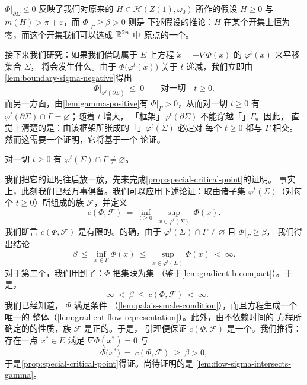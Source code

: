 \trEstimate{} $\Phi\big|_{\partial\Sigma}\leq0$ 反映了我们对原来的%
\trHamiltonianFunction{} $H\in\mathcal{H}(Z(1),\omega_{0})$ 所作的假设%
$H\geq0$ 与 $m(H)>\pi+\varepsilon$，而 $\Phi\big|_{\Gamma}\geq\beta>0$ 则是%
下述假设的推论：$H$ 在某个开集上恒为零，而这个开集我们可以选成 $\mathbb{R}^{2n}$ 中%
原点的一个\trNeighborhood。

接下来我们研究：如果我们借助属于 $E$ 上\trGradient{}方程%
$\dot{x}=-\nabla\Phi(x)$ 的\trFlow{} $\varphi^{t}(x)$ 来平移集合 $\Sigma$，%
将会发生什么。由于 $\Phi\bigl(\varphi^{t}(x)\bigr)$ 关于 $t$ 递减，我们立即由%
\cref{lem:boundary-sigma-negative}得出
\begin{equation}\label{eq:phi-boundary-translate}
\Phi\big|_{\varphi^{t}(\partial\Sigma)}\ \leq\ 0\qquad\text{对一切}\quad t\geq0.
\end{equation}
而另一方面，由\cref{lem:gamma-positive}有 $\Phi\big|_{\Gamma}>0$，从而对一切%
$t\geq0$ 有 $\varphi^{t}(\partial\Sigma)\cap\Gamma=\varnothing$；随着 $t$ 增大，%
「框架」$\varphi^{t}(\partial\Sigma)$ 不能穿越「\trCircle」$\Gamma$。因此，%
直觉上清楚的是：由该框架所张成的「\trSurface」$\varphi^{t}(\Sigma)$ 必定对%
每个 $t\geq0$ 都与 $\Gamma$ 相交。然而这需要一个证明，它将基于一个%
\trTopology{}论证。

\begin{lemma}\label{lem:flow-sigma-intersects-gamma}
对一切 $t\geq0$ 有 $\varphi^{t}(\Sigma)\cap\Gamma\neq\varnothing$。
\end{lemma}

我们把它的证明往后放一放，先来完成\cref{prop:special-critical-point}的证明。%
事实上，此刻我们已经万事俱备。我们可以应用下述\trMinimax{}论证：取由诸子集%
$\varphi^{t}(\Sigma)$（对每个 $t\geq0$）所组成的族 $\mathcal{F}$，并定义
\[
c(\Phi,\mathcal{F})\ =\ \inf_{t\geq0}\ \sup_{x\in\varphi^{t}(\Sigma)}\ \Phi(x).
\]
我们断言 $c(\Phi,\mathcal{F})$ 是有限的。的确，由于%
$\varphi^{t}(\Sigma)\cap\Gamma\neq\varnothing$ 且 $\Phi\big|_{\Gamma}\geq\beta$，%
我们得出结论
\[
\beta\ \leq\ \inf_{x\in\Gamma}\Phi(x)\ \leq\ \sup_{x\in\varphi^{t}(\Sigma)}%
\Phi(x)\ <\ \infty.
\]
对于第二个\trEstimate，我们用到了：$\Phi$ 把\trBounded{}集映为\trBounded{}集%
（鉴于\cref{lem:gradient-b-compact}）。于是，
\[
-\infty\ <\ \beta\ \leq\ c(\Phi,\mathcal{F})\ <\ \infty.
\]
我们已经知道，\trFunctional{} $\Phi$ 满足\trPalaisSmale{}条件%
（\cref{lem:palais-smale-condition}），而且\trGradient{}方程生成一个唯一的%
整体\trFlow{}（\cref{lem:gradient-flow-representation}）。此外，由不依赖时间的%
方程所确定的\trFlow{}的性质，族 $\mathcal{F}$ 是正\trInvariant{}的。于是，%
\trMinimax{}引理便保证 $c(\Phi,\mathcal{F})$ 是一个\trCriticalValue。我们推得：%
存在一点 $x^{*}\in E$ 满足 $\nabla\Phi(x^{*})=0$ 与
\[
\Phi\bigl(x^{*}\bigr)\ =\ c(\Phi,\mathcal{F})\ \geq\ \beta>0,
\]
于是\cref{prop:special-critical-point}得证。尚待证明的是%
\cref{lem:flow-sigma-intersects-gamma}。

